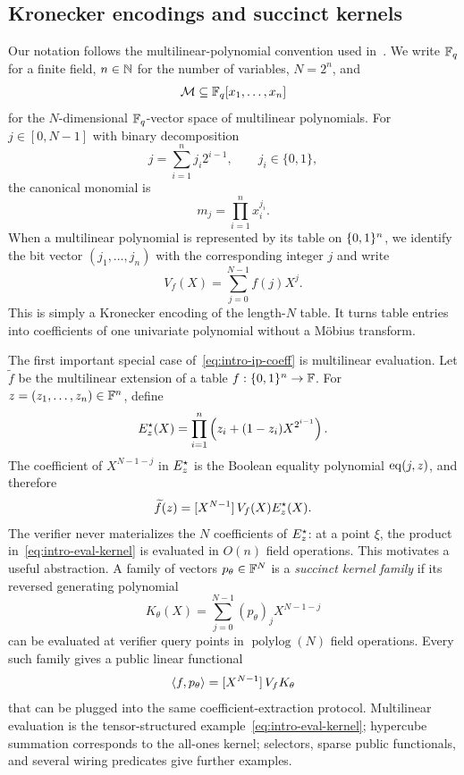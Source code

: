 \subsection{Kronecker encodings and succinct kernels}

Our notation follows the multilinear-polynomial convention used in~\cite{MkhidaIguider26}.  We write $\mathbb{F}_q$ for a finite field, $n\in\mathbb{N}$ for the number of variables, $N=2^n$, and
\[
  \mathcal{M}\subseteq \mathbb{F}_q[x_1,\ldots,x_n]
\]
for the $N$-dimensional $\mathbb{F}_q$-vector space of multilinear polynomials.  For $j\in[0,N-1]$ with binary decomposition
\[
  j=\sum_{i=1}^{n}j_i2^{i-1},\qquad j_i\in\{0,1\},
\]
the canonical monomial is
\[
  m_j=\prod_{i=1}^{n}x_i^{j_i}.
\]
When a multilinear polynomial is represented by its table on $\{0,1\}^n$, we identify the bit vector $(j_1,\ldots,j_n)$ with the corresponding integer $j$ and write
\begin{equation}
  V_f(X)=\sum_{j=0}^{N-1}f(j)X^j.
  \label{eq:intro-table-encoding}
\end{equation}
This is simply a Kronecker encoding of the length-$N$ table.  It turns table entries into coefficients of one univariate polynomial without a M\"obius transform.

The first important special case of~\eqref{eq:intro-ip-coeff} is multilinear evaluation.  Let $\widetilde f$ be the multilinear extension of a table $f:\{0,1\}^n\to\mathbb{F}$.  For $z=(z_1,\ldots,z_n)\in\mathbb{F}^n$, define
\begin{equation}
  E_z^{\star}(X)
  =\prod_{i=1}^{n}\left(z_i+(1-z_i)X^{2^{i-1}}\right).
  \label{eq:intro-eval-kernel}
\end{equation}
The coefficient of $X^{N-1-j}$ in $E_z^{\star}$ is the Boolean equality polynomial $\operatorname{eq}(j,z)$, and therefore
\begin{equation}
  \widetilde f(z)=[X^{N-1}]\,V_f(X)E_z^{\star}(X).
  \label{eq:intro-evaluation-extraction}
\end{equation}
The verifier never materializes the $N$ coefficients of $E_z^{\star}$: at a point $\xi$, the product in~\eqref{eq:intro-eval-kernel} is evaluated in $O(n)$ field operations.  This motivates a useful abstraction.  A family of vectors $p_\theta\in\mathbb{F}^N$ is a \emph{succinct kernel family} if its reversed generating polynomial
\[
  K_\theta(X)=\sum_{j=0}^{N-1}(p_\theta)_jX^{N-1-j}
\]
can be evaluated at verifier query points in $\operatorname{polylog}(N)$ field operations.  Every such family gives a public linear functional
\[
  \left\langle f,p_\theta\right\rangle=[X^{N-1}]\,V_fK_\theta
\]
that can be plugged into the same coefficient-extraction protocol.  Multilinear evaluation is the tensor-structured example~\eqref{eq:intro-eval-kernel}; hypercube summation corresponds to the all-ones kernel; selectors, sparse public functionals, and several wiring predicates give further examples.

